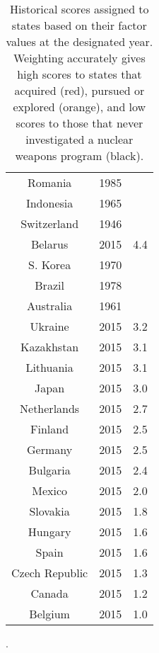 \begin{table}
\begin{minipage}{.5\textwidth}
\begin{tabular}{|c|c|c|}
Romania & 1985 & \color{red}{4.5} \\
Indonesia & 1965 & \color{red}{4.4} \\
Switzerland & 1946 & \color{red}{4.4} \\
Belarus & 2015 & 4.4 \\
S. Korea & 1970 & \color{red}{4.4} \\
Brazil & 1978 & \color{red}{4.3} \\
Australia & 1961 & \color{red}{3.9} \\
Ukraine & 2015 & 3.2 \\
Kazakhstan & 2015 & 3.1 \\
Lithuania & 2015 & 3.1 \\
Japan & 2015 & 3.0 \\
Netherlands & 2015 & 2.7 \\
Finland & 2015 & 2.5 \\
Germany & 2015 & 2.5 \\
Bulgaria & 2015 & 2.4 \\
Mexico & 2015 & 2.0 \\
Slovakia & 2015 & 1.8 \\
Hungary & 2015 & 1.6 \\
Spain & 2015 & 1.6 \\
Czech Republic & 2015 & 1.3 \\
Canada & 2015 & 1.2 \\
Belgium & 2015 & 1.0 \\
\hline
\end{tabular}
\end{minipage}\hfill
\caption{Historical scores assigned to states based on their factor values at the designated year. Weighting accurately gives high scores to states that acquired (red), pursued or explored (orange), and low scores to those that never investigated a nuclear weapons program (black).}
\label{tab:state_scores}
\end{table}



.


